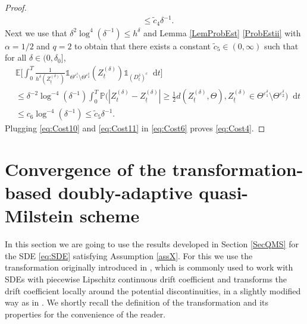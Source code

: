 \documentclass[11pt,a4paper]{article}
\numberwithin{equation}{section}
\theoremstyle{definition}
\newcommand{\E}{{\mathbb{E}}}
\renewcommand{\P}{{\mathbb{P}}}
\newcommand{\diff}{\mathop{}\!\mathrm{d}}
\begin{document}
\begin{proof}
\begin{equation}
\begin{aligned}
            &\leq \widetilde c_4 \delta^{-1}.
        \end{aligned}
    \end{equation} 
    Next we use that $\delta^2\log^{4}(\delta^{-1}) \leq h^{\delta}$ and Lemma \ref{LemProbEst} \ref{ProbEstii} with $\alpha=1/2$ and $q=2$ to obtain that there exists a constant $\widetilde c_5 \in(0,\infty)$ such that for all $\delta\in(0,\delta_0]$,
    \begin{equation}\label{eq:Cost11}
        \begin{aligned}
            &\E\Big[ \int_0^T  \frac{1}{h^\delta(Z^{(\delta)}_{\underline t})} \mathds{1}_{\Theta^{\varepsilon_1^\delta}\setminus\Theta^{\varepsilon_2^\delta} }(Z^{(\delta)}_{\underline t}) \mathds{1}_{(D_t^{\delta})^c}\diff t\Big]\\
            &\leq \delta^{-2} \log^{-4}(\delta^{-1}) \int_0^T \P\Big( | Z^{(\delta)}_t- Z^{(\delta)}_{\underline t}| \geq \frac{1}{2} d(Z^{(\delta)}_{\underline t},\Theta), Z^{(\delta)}_{\underline t} \in\Theta^{\varepsilon_1^\delta}\setminus\Theta^{\varepsilon_2^\delta} \Big) \diff t\\
            &\leq c_6 \log^{-4}(\delta^{-1}) \leq \widetilde c_5 \delta^{-1}.
        \end{aligned}
    \end{equation} 
    Plugging \eqref{eq:Cost10} and \eqref{eq:Cost11} in \eqref{eq:Cost6} proves \eqref{eq:Cost4}.
\end{proof}


\section{Convergence of the transformation-based doubly-adaptive quasi-Milstein scheme}\label{ConvDAqMS}

In this section we are going to use the results developed in Section \ref{SecQMS} for the SDE \eqref{eq:SDE} satisfying Assumption \eqref{assX}. For this we use the transformation originally introduced in \cite{LS17b}, which is commonly used to work with SDEs with piecewise Lipschitz continuous drift coefficient and transforms the drift coefficient locally around the potential discontinuities, in a slightly modified way as in \cite{muellergronbach2019b}. We shortly recall the definition of the transformation and its properties for the convenience of the reader. 
\end{document}
